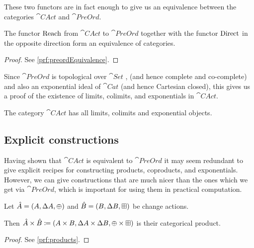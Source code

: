 These two functors are in fact enough to give us an equivalence between the categories
$\cat{CAct}$ and $\cat{PreOrd}$.

\begin{thm}[name=Equivalence of $\cat{CAct}$ and $\cat{PreOrd}$, restate=preordEquivalence]
  \label{thm:preordEquivalence}
  The functor $\operatorname{Reach}$ from $\cat{CAct}$ to $\cat{PreOrd}$ together with the
  functor $\operatorname{Direct}$ in the opposite direction form an equivalence of categories.
\end{thm}
\ifproofs
\begin{proof}
  See \cref{prf:preordEquivalence}.
\end{proof}
\fi

Since $\cat{PreOrd}$ is topological over $\cat{Set}$ \autocite[][Chapter V]{adamek2004abstract}, 
(and hence complete and co-complete) and also an exponential ideal of $\cat{Cat}$
(and hence Cartesian closed), this gives us a proof of the existence of limits, colimits, and exponentials in $\cat{CAct}$.

\begin{corollary}
  The category $\cat{CAct}$ has all limits, colimits and exponential objects.
\end{corollary}

\subsection{Explicit constructions}

Having shown that $\cat{CAct}$ is equivalent to $\cat{PreOrd}$ it may seem
redundant to give explicit recipes for constructing products, coproducts, and exponentials.
However, we can give constructions that are much nicer than the ones
which we get via $\cat{PreOrd}$, which is important for using them in
practical computation.

\begin{prop}[name=Products, restate=products]
  \label{prop:products}
  Let $\hat{A} = (A,\Delta A,\oplus)$ and $\hat{B} =
  (B,\Delta B,\boxplus)$ be change actions.

  Then $\hat{A} \times \hat{B} \coloneqq (A \times B,\Delta A \times
  \Delta B,\oplus \times \boxplus)$ is their categorical product.
\end{prop}
\ifproofs
\begin{proof}
  See \cref{prf:products}.
\end{proof}
\fi

